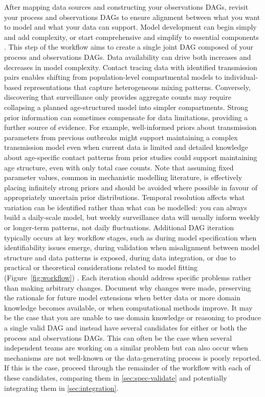 \documentclass{article}
\begin{document}
After mapping data sources and constructing your observations DAGs, revisit your process and observations DAGs to ensure alignment between what you want to model and what your data can support.
Model development can begin simply and add complexity, or start comprehensive and simplify to essential components \citep{gelman2020bayesian}.
This step of the workflow aims to create a single joint DAG composed of your process and observations DAGs.
Data availability can drive both increases and decreases in model complexity.
Contact tracing data with identified transmission pairs enables shifting from population-level compartmental models to individual-based representations that capture heterogeneous mixing patterns.
Conversely, discovering that surveillance only provides aggregate counts may require collapsing a planned age-structured model into simpler compartments.
Strong prior information can sometimes compensate for data limitations, providing a further source of evidence.
For example, well-informed priors about transmission parameters from previous outbreaks might support maintaining a complex transmission model even when current data is limited and detailed knowledge about age-specific contact patterns from prior studies could support maintaining age structure, even with only total case counts.
Note that assuming fixed parameter values, common in mechanistic modelling literature, is effectively placing infinitely strong priors and should be avoided where possible in favour of appropriately uncertain prior distributions.
Temporal resolution affects what variation can be identified rather than what can be modelled: you can always build a daily-scale model, but weekly surveillance data will usually inform weekly or longer-term patterns, not daily fluctuations.
Additional DAG iteration typically occurs at key workflow stages, such as during model specification when identifiability issues emerge, during validation when misalignment between model structure and data patterns is exposed, during data integration, or due to practical or theoretical considerations related to model fitting (Figure~\ref{fig:workflow}) \citep{corbella2022inferring}.
Each iteration should address specific problems rather than making arbitrary changes.
Document why changes were made, preserving the rationale for future model extensions when better data or more domain knowledge becomes available, or when computational methods improve.
It may be the case that you are unable to use domain knowledge or reasoning to produce a single valid DAG and instead have several candidates for either or both the process and observations DAGs. 
This can often be the case when several independent teams are working on a similar problem but can also occur when mechanisms are not well-known or the data-generating process is poorly reported.
If this is the case, proceed through the remainder of the workflow with each of these candidates, comparing them in \ref{sec:spec-validate} and potentially integrating them in \ref{sec:integration}.
\end{document}
